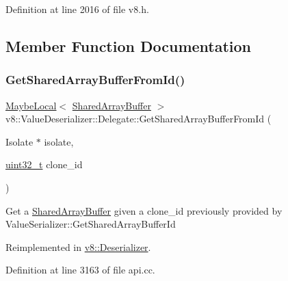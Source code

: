Definition at line 2016 of file v8.\+h.



\subsection{Member Function Documentation}
\mbox{\label{classv8_1_1ValueDeserializer_1_1Delegate_afaffdb0ab5dd659ae89377d5e9b6cbf7}} 
\subsubsection{\texorpdfstring{Get\+Shared\+Array\+Buffer\+From\+Id()}{GetSharedArrayBufferFromId()}}
{\footnotesize\ttfamily \mbox{\hyperlink{classv8_1_1MaybeLocal}{Maybe\+Local}}$<$ \mbox{\hyperlink{classv8_1_1SharedArrayBuffer}{Shared\+Array\+Buffer}} $>$ v8\+::\+Value\+Deserializer\+::\+Delegate\+::\+Get\+Shared\+Array\+Buffer\+From\+Id (\begin{DoxyParamCaption}\item[{Isolate $\ast$}]{isolate,  }\item[{\mbox{\hyperlink{classuint32__t}{uint32\+\_\+t}}}]{clone\+\_\+id }\end{DoxyParamCaption})\hspace{0.3cm}{\ttfamily [virtual]}}

Get a \mbox{\hyperlink{classv8_1_1SharedArrayBuffer}{Shared\+Array\+Buffer}} given a clone\+\_\+id previously provided by Value\+Serializer\+::\+Get\+Shared\+Array\+Buffer\+Id 

Reimplemented in \mbox{\hyperlink{classv8_1_1Deserializer_a2a0c866dd14f5482bf5e131dcd181bd5}{v8\+::\+Deserializer}}.



Definition at line 3163 of file api.\+cc.

\mbox{\label{classv8_1_1ValueDeserializer_1_1Delegate_a23fc01bc6da1da36bf1d555edd493d83}} 
